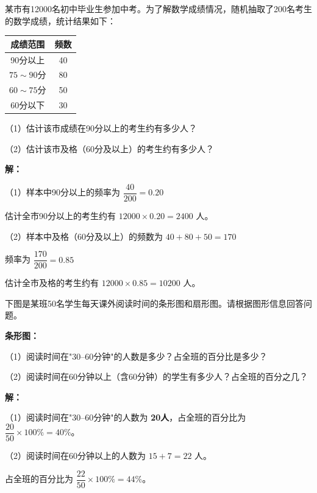 \documentclass[12pt, a4paper]{ctexart}
\begin{document}
\begin{examplebox}[【例题5】用样本估计总体]
某市有12000名初中毕业生参加中考。为了解数学成绩情况，随机抽取了200名考生的数学成绩，统计结果如下：

\begin{center}
\begin{tabular}{|c|c|}
\hline
成绩范围 & 频数 \\
\hline
90分以上 & 40 \\
\hline
$75 \sim 90$分 & 80 \\
\hline
$60 \sim 75$分 & 50 \\
\hline
60分以下 & 30 \\
\hline
\end{tabular}
\end{center}

（1）估计该市成绩在90分以上的考生约有多少人？

（2）估计该市及格（60分及以上）的考生约有多少人？

\textbf{解：}

（1）样本中90分以上的频率为 $\dfrac{40}{200} = 0.20$

估计全市90分以上的考生约有 $12000 \times 0.20 = 2400$ 人。

（2）样本中及格（60分及以上）的频数为 $40 + 80 + 50 = 170$

频率为 $\dfrac{170}{200} = 0.85$

估计全市及格的考生约有 $12000 \times 0.85 = 10200$ 人。
\end{examplebox}

\begin{examplebox}[【例题6】统计图的综合分析]
下图是某班50名学生每天课外阅读时间的条形图和扇形图。请根据图形信息回答问题。

\textbf{条形图：}

\begin{center}
\end{center}

（1）阅读时间在"30--60分钟"的人数是多少？占全班的百分比是多少？

（2）阅读时间在60分钟以上（含60分钟）的学生有多少人？占全班的百分之几？

\textbf{解：}

（1）阅读时间在"30--60分钟"的人数为 \textbf{20人}，占全班的百分比为 $\dfrac{20}{50} \times 100\% = 40\%$。

（2）阅读时间在60分钟以上的人数为 $15 + 7 = 22$ 人。

占全班的百分比为 $\dfrac{22}{50} \times 100\% = 44\%$。
\end{examplebox}
\end{document}
